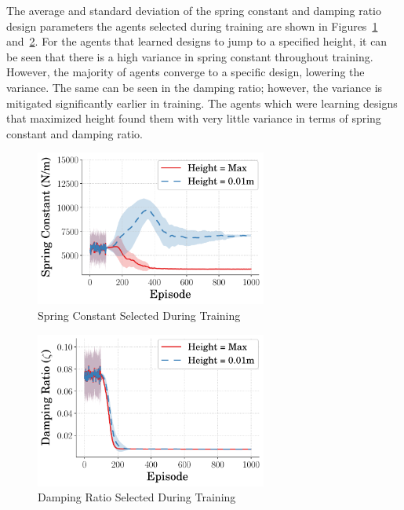 \documentclass[letterpaper, 10 pt, conference]{ieeeconf}  %
\begin{document}
The average and standard deviation of the spring constant and damping ratio design parameters the agents selected during training are shown in Figures~\ref{fig:spring_vs_step_far} and~\ref{fig:zeta_vs_step_far}. For the agents that learned designs to jump to a specified height, it can be seen that there is a high variance in spring constant throughout training. However, the majority of agents converge to a specific design, lowering the variance. The same can be seen in the damping ratio; however, the variance is mitigated significantly earlier in training. The agents which were learning designs that maximized height found them with very little variance in terms of spring constant and damping ratio. 

%
\begin{figure}[tb]
        \begin{center}
        \includegraphics[width = 3in]{figures/wide_design_space/SpringVsTime_2021-10-12_221551.pdf}  
        \caption{Spring Constant Selected During Training}
        \label{fig:spring_vs_step_far}
        \end{center}
        \end{figure}
%
\begin{figure}[tb]
        \begin{center}
        \includegraphics[width = 3in]{figures/wide_design_space/ZetaVsTime_2021-10-12_145006.pdf}  
        \caption{Damping Ratio Selected During Training}
        \label{fig:zeta_vs_step_far}
        \end{center}
        \end{figure}
\end{document}
